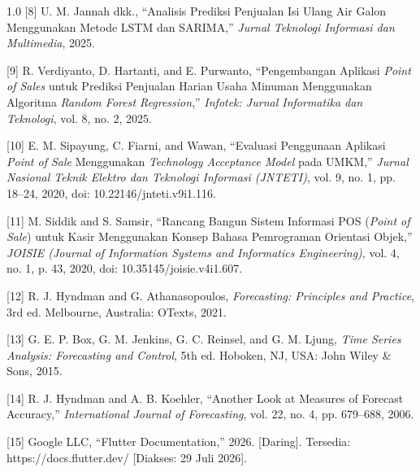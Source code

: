 \documentclass[12pt, a4paper, onecolumn, oneside]{report}
\begin{document}
\begin{spacing}{1.0}
\vspace{0.3cm}
\noindent\hangindent=1.5cm
{[8]} U. M. Jannah dkk., ``Analisis Prediksi Penjualan Isi Ulang Air Galon Menggunakan Metode LSTM dan SARIMA,'' \textit{Jurnal Teknologi Informasi dan Multimedia}, 2025.

\vspace{0.3cm}
\noindent\hangindent=1.5cm
{[9]} R. Verdiyanto, D. Hartanti, and E. Purwanto, ``Pengembangan Aplikasi \textit{Point of Sales} untuk Prediksi Penjualan Harian Usaha Minuman Menggunakan Algoritma \textit{Random Forest Regression},'' \textit{Infotek: Jurnal Informatika dan Teknologi}, vol. 8, no. 2, 2025.

\vspace{0.3cm}
\noindent\hangindent=1.5cm
{[10]} E. M. Sipayung, C. Fiarni, and Wawan, ``Evaluasi Penggunaan Aplikasi \textit{Point of Sale} Menggunakan \textit{Technology Acceptance Model} pada UMKM,'' \textit{Jurnal Nasional Teknik Elektro dan Teknologi Informasi (JNTETI)}, vol. 9, no. 1, pp. 18--24, 2020, doi: 10.22146/jnteti.v9i1.116.

\vspace{0.3cm}
\noindent\hangindent=1.5cm
{[11]} M. Siddik and S. Samsir, ``Rancang Bangun Sistem Informasi POS (\textit{Point of Sale}) untuk Kasir Menggunakan Konsep Bahasa Pemrograman Orientasi Objek,'' \textit{JOISIE (Journal of Information Systems and Informatics Engineering)}, vol. 4, no. 1, p. 43, 2020, doi: 10.35145/joisie.v4i1.607.

\vspace{0.3cm}
\noindent\hangindent=1.5cm
{[12]} R. J. Hyndman and G. Athanasopoulos, \textit{Forecasting: Principles and Practice}, 3rd ed. Melbourne, Australia: OTexts, 2021.

\vspace{0.3cm}
\noindent\hangindent=1.5cm
{[13]} G. E. P. Box, G. M. Jenkins, G. C. Reinsel, and G. M. Ljung, \textit{Time Series Analysis: Forecasting and Control}, 5th ed. Hoboken, NJ, USA: John Wiley \& Sons, 2015.

\vspace{0.3cm}
\noindent\hangindent=1.5cm
{[14]} R. J. Hyndman and A. B. Koehler, ``Another Look at Measures of Forecast Accuracy,'' \textit{International Journal of Forecasting}, vol. 22, no. 4, pp. 679--688, 2006.

\vspace{0.3cm}
\noindent\hangindent=1.5cm
{[15]} Google LLC, ``Flutter Documentation,'' 2026. [Daring]. Tersedia: https://docs.flutter.dev/ [Diakses: 29 Juli 2026].


\end{spacing}
\end{document}
